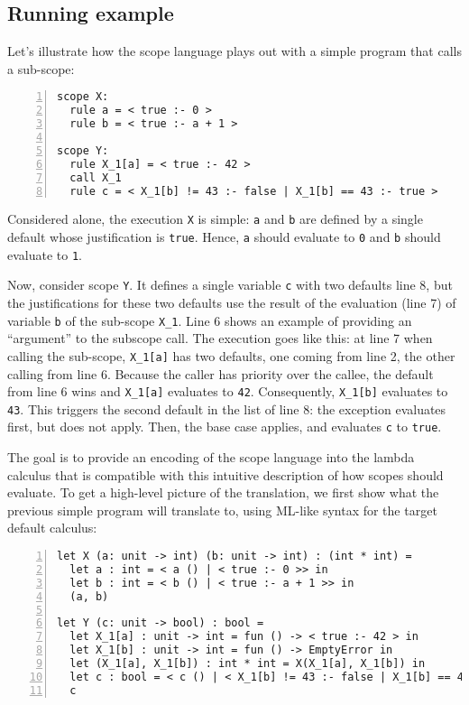 \documentclass[11pt,a4paper]{article}
\begin{document}
\subsection{Running example}
\label{sec:scope:example}

Let's illustrate how the scope language plays out with a simple program 
that calls a sub-scope:
\begin{Verbatim}[frame=lines,label=Simple scope program, numbers=left, framesep=10pt, samepage=true]
scope X:
  rule a = < true :- 0 >
  rule b = < true :- a + 1 >

scope Y:
  rule X_1[a] = < true :- 42 >
  call X_1
  rule c = < X_1[b] != 43 :- false | X_1[b] == 43 :- true > 
\end{Verbatim}

Considered alone, the execution \Verb+X+ is simple: \Verb+a+ and \Verb+b+ are defined by 
a single default whose justification is \Verb+true+. Hence, \Verb+a+ should evaluate 
to \Verb+0+ and \Verb+b+ should evaluate to \Verb+1+.

Now, consider scope \Verb+Y+. It defines a single variable \Verb+c+ with two defaults 
line 8, but the justifications for these two defaults use the result of 
the evaluation (line 7) of variable \Verb+b+ of the sub-scope \Verb+X_1+. 
Line 6 shows an example of providing an \enquote{argument} to the subscope call.
The execution goes like this: at line 7 when calling the sub-scope,
\Verb+X_1[a]+ has two defaults, one coming from line 2, the other calling 
from line 6. Because the caller has priority over the callee, the default from line 
6 wins and \Verb+X_1[a]+ evaluates to \Verb+42+. Consequently,
\Verb+X_1[b]+ evaluates to \Verb+43+.
This triggers the second default in the list of line 8: the exception 
evaluates first, but does not apply. Then, the base case applies,
and evaluates \Verb+c+ to \Verb+true+. 

The goal is to provide an encoding of the scope language 
into the lambda calculus that is compatible with this intuitive description 
of how scopes should evaluate. To get a high-level 
picture of the translation, we first show what the previous simple program will translate 
to, using ML-like syntax for the target default calculus:
\begin{Verbatim}[frame=lines,label=Simple default program, numbers=left, framesep=10pt, samepage=true]
let X (a: unit -> int) (b: unit -> int) : (int * int) =
  let a : int = < a () | < true :- 0 >> in
  let b : int = < b () | < true :- a + 1 >> in 
  (a, b)

let Y (c: unit -> bool) : bool = 
  let X_1[a] : unit -> int = fun () -> < true :- 42 > in
  let X_1[b] : unit -> int = fun () -> EmptyError in 
  let (X_1[a], X_1[b]) : int * int = X(X_1[a], X_1[b]) in 
  let c : bool = < c () | < X_1[b] != 43 :- false | X_1[b] == 43 :- true >> in 
  c 
\end{Verbatim}
\end{document}
